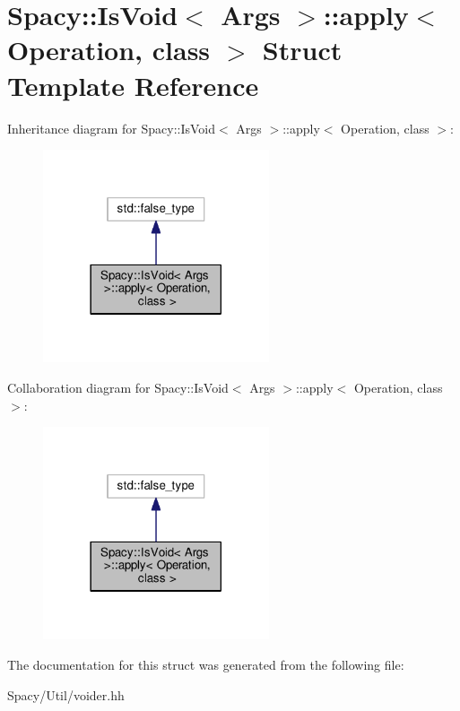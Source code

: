 \hypertarget{structSpacy_1_1IsVoid_1_1apply}{}\section{Spacy\+:\+:Is\+Void$<$ Args $>$\+:\+:apply$<$ Operation, class $>$ Struct Template Reference}
\label{structSpacy_1_1IsVoid_1_1apply}


Inheritance diagram for Spacy\+:\+:Is\+Void$<$ Args $>$\+:\+:apply$<$ Operation, class $>$\+:\nopagebreak
\begin{figure}[H]
\begin{center}
\leavevmode
\includegraphics[width=189pt]{structSpacy_1_1IsVoid_1_1apply__inherit__graph}
\end{center}
\end{figure}


Collaboration diagram for Spacy\+:\+:Is\+Void$<$ Args $>$\+:\+:apply$<$ Operation, class $>$\+:\nopagebreak
\begin{figure}[H]
\begin{center}
\leavevmode
\includegraphics[width=189pt]{structSpacy_1_1IsVoid_1_1apply__coll__graph}
\end{center}
\end{figure}


The documentation for this struct was generated from the following file\+:\begin{DoxyCompactItemize}
\item 
Spacy/\+Util/voider.\+hh\end{DoxyCompactItemize}
